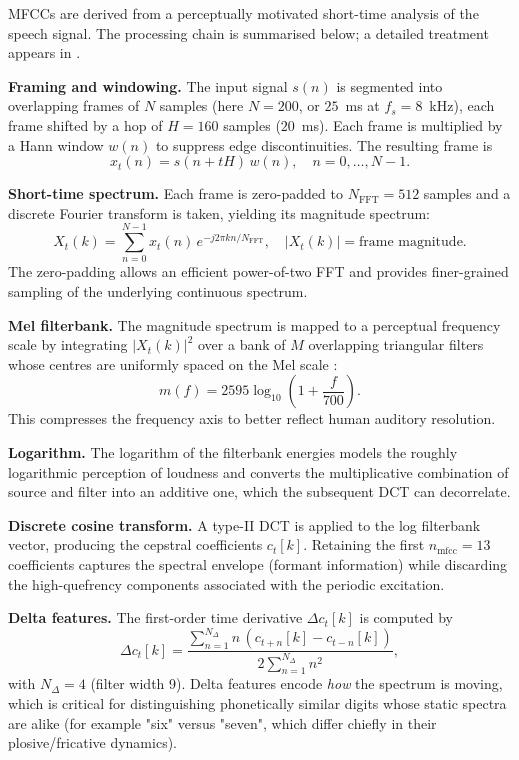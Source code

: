 \documentclass[12pt,a4paper]{article}
\begin{document}
MFCCs are derived from a perceptually motivated short-time analysis of the
speech signal. The processing chain is summarised below; a detailed treatment
appears in \cite{rabiner2007introduction,rabiner1993fundamentals,davis1980comparison}.

\textbf{Framing and windowing.} The input signal $s(n)$ is segmented into
overlapping frames of $N$ samples (here $N = 200$, or $25$~ms at $f_s = 8$~kHz),
each frame shifted by a hop of $H = 160$ samples ($20$~ms). Each frame is
multiplied by a Hann window $w(n)$ to suppress edge discontinuities. The
resulting frame is
\begin{equation}
    x_t(n) = s(n + tH)\,w(n), \quad n = 0, \ldots, N-1.
\end{equation}

\textbf{Short-time spectrum.} Each frame is zero-padded to
$N_\text{FFT} = 512$ samples and a discrete Fourier transform is taken,
yielding its magnitude spectrum:
\begin{equation}
    X_t(k) = \sum_{n=0}^{N-1} x_t(n)\, e^{-j 2\pi k n / N_\text{FFT}}, \quad
    |X_t(k)| = \text{frame magnitude}.
\end{equation}
The zero-padding allows an efficient power-of-two FFT and provides
finer-grained sampling of the underlying continuous spectrum.

\textbf{Mel filterbank.} The magnitude spectrum is mapped to a perceptual
frequency scale by integrating $|X_t(k)|^2$ over a bank of $M$ overlapping
triangular filters whose centres are uniformly spaced on the Mel scale
\cite{stevens1937scale,davis1980comparison}:
\begin{equation}
    m(f) = 2595 \log_{10}\!\left(1 + \frac{f}{700}\right).
\end{equation}
This compresses the frequency axis to better reflect human auditory
resolution.

\textbf{Logarithm.} The logarithm of the filterbank energies models the
roughly logarithmic perception of loudness and converts the multiplicative
combination of source and filter into an additive one, which the subsequent
DCT can decorrelate.

\textbf{Discrete cosine transform.} A type-II DCT is applied to the log
filterbank vector, producing the cepstral coefficients $c_t[k]$. Retaining
the first $n_\text{mfcc} = 13$ coefficients captures the spectral envelope
(formant information) while discarding the high-quefrency components
associated with the periodic excitation.

\textbf{Delta features.} The first-order time derivative
$\Delta c_t[k]$ is computed by
\begin{equation}
    \Delta c_t[k] = \frac{\sum_{n=1}^{N_\Delta} n\,(c_{t+n}[k] - c_{t-n}[k])}{2 \sum_{n=1}^{N_\Delta} n^2},
\end{equation}
with $N_\Delta = 4$ (filter width 9). Delta features encode \emph{how} the
spectrum is moving, which is critical for distinguishing phonetically similar
digits whose static spectra are alike (for example "six" versus "seven",
which differ chiefly in their plosive/fricative dynamics).
\end{document}

